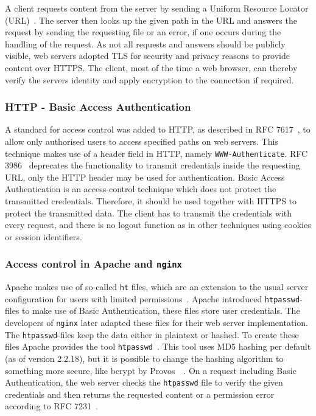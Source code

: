 A client requests content from the server by sending a Uniform Resource Locator
(URL)~\cite{rfc3986}. The server then looks up the given path in the URL and
answers the request by sending the requesting file or an error, if one occurs
during the handling of the request. As not all requests and answers should be
publicly visible, web servers adopted TLS for security and privacy reasons to
provide content over HTTPS. The client, most of the time a web browser, can
thereby verify the server\textquotesingle s identity and apply encryption to the
connection if required.

\subsubsection{HTTP - Basic Access Authentication}
\label{sec:httauth}

A standard for access control was added to HTTP, as described in RFC
7617~\cite{rfc7617}, to allow only authorised users to access specified paths on
web servers. This technique makes use of a header field in HTTP, namely
\texttt{WWW-Authenticate}. RFC 3986~\cite{rfc3986} deprecates the functionality
to transmit credentials inside the requesting URL, only the HTTP header may be
used for authentication. Basic Access Authentication is an access-control
technique which does not protect the transmitted credentials. Therefore, it
should be used together with HTTPS to protect the transmitted data. The client
has to transmit the credentials with every request, and there is no logout
function as in other techniques using cookies or session identifiers.

\subsubsection{Access control in Apache and \texttt{nginx}}

Apache makes use of so-called \texttt{ht} files, which are an extension to the
usual server configuration for users with limited
permissions~\cite{apacheauthdoc}. Apache introduced \texttt{htpasswd}-files to
make use of Basic Authentication, these files store user credentials. The
developers of \texttt{nginx} later adapted these files for their web server
implementation. The \texttt{htpasswd}-files keep the data either in plaintext or
hashed. To create these files Apache provides the tool
\texttt{htpasswd}~\cite{htpasswddoc}. This tool uses MD5 hashing per default (as
of version 2.2.18), but it is possible to change the hashing algorithm to
something more secure, like bcrypt by Provos~\etal~\cite{bcrypt}. On a request
including Basic Authentication, the web server checks the \texttt{htpasswd} file
to verify the given credentials and then returns the requested content or a
permission error according to RFC 7231~\cite{rfc7231}.


